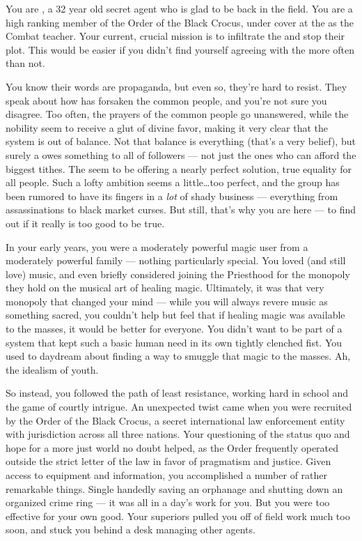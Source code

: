 \documentclass[char]{GL2020}
\begin{document}
\name{\cInterpol{}}

You are \cInterpol{\intro}, a 32 year old secret agent who is glad to be back in the field. You are a high ranking member of the Order of the Black Crocus, under cover at the \pSchool{} as the Combat teacher. Your current, crucial mission is to infiltrate the \pGoaties{} and stop their plot. This would be easier if you didn't find yourself agreeing with the \pGoaties{} more often than not.

You know their words are propaganda, but even so, they're hard to resist. They speak about how \cFarmGod{} has forsaken the common people, and you're not sure you disagree. Too often, the prayers of the common people go unanswered, while the nobility seem to receive a glut of divine favor, making it very clear that the system is out of balance. Not that balance is everything (that's a very \pShippie{} belief), but surely a \cFarmGod{\God} owes something to all of \cFarmGod{\their} followers — not just the ones who can afford the biggest tithes. The \pGoaties{} seem to be offering a nearly perfect solution, true equality for all people. Such a lofty ambition seems a little\ldots{}too perfect, and the group has been rumored to have its fingers in a \emph{lot} of shady business — everything from assassinations to black market curses. But still, that's why you are here — to find out if it really is too good to be true.

In your early years, you were a moderately powerful magic user from a moderately powerful family — nothing particularly special. You loved (and still love) music, and even briefly considered joining the Priesthood for the monopoly they hold on the musical art of healing magic. Ultimately, it was that very monopoly that changed your mind — while you will always revere music as something sacred, you couldn't help but feel that if healing magic was available to the masses, it would be better for everyone. You didn't want to be part of a system that kept such a basic human need in its own tightly clenched fist. You used to daydream about finding a way to smuggle that magic to the masses. Ah, the idealism of youth. 

So instead, you followed the path of least resistance, working hard in school and the game of courtly intrigue. An unexpected twist came when you were recruited by the Order of the Black Crocus, a secret international law enforcement entity with jurisdiction across all three nations. Your questioning of the status quo and hope for a more just world no doubt helped, as the Order frequently operated outside the strict letter of the law in favor of pragmatism and justice. Given access to equipment and information, you accomplished a number of rather remarkable things. Single handedly saving an orphanage and shutting down an organized crime ring — it was all in a day's work for you. But you were too effective for your own good. Your superiors pulled you off of field work much too soon, and stuck you behind a desk managing other agents.
\end{document}
